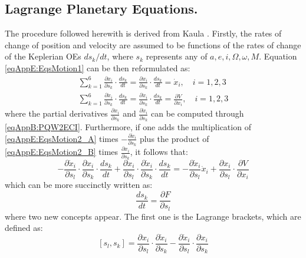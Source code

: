 	\subsection{Lagrange Planetary Equations.}\label{secAppE:LPE}
	\indent The procedure followed herewith is derived from Kaula \cite{Kaula}. Firstly, the rates of change of position and velocity are assumed to be functions of the rates of change of the Keplerian OEs $ds_k/dt$, where $s_k$ represents any of $a, e, i, \Omega, \omega, M$. Equation \eqref{eqAppE:EqsMotion1} can be then reformulated as:
	\begin{align}
	\label{eqAppE:EqsMotion2_A} \sum_{k=1}^{6} \frac{\partial x_{i}}{\partial s_{k}} \cdot \frac{d s_{k}}{d t}=\frac{\partial x_{i}}{\partial s_{k}} \cdot \frac{d s_{k}}{d t}=\dot{x}_{i}, \quad i=1,2,3 \\
	\label{eqAppE:EqsMotion2_B} \sum_{k=1}^{6} \frac{\partial \dot{x}_{i}}{\partial s_{k}} \cdot \frac{d s_{k}}{d t}=\frac{\partial \dot{x}_{i}}{\partial s_{k}} \cdot \frac{d s_{k}}{d t}=\frac{\partial V}{\partial x_{i}}, \quad i=1,2,3
	\end{align}
	\noindent where the partial derivatives $\frac{\partial x_{i}}{\partial s_{k}}$ and $\frac{\partial \dot{x}_{i}}{\partial s_{k}}$ can be computed through \eqref{eqAppB:PQW2ECI}. Furthermore, if one adds the multiplication of \eqref{eqAppE:EqsMotion2_A} times $- \frac{\partial \dot{x}_{i}}{\partial s_{k}}$ plus the product of \eqref{eqAppE:EqsMotion2_B} times $\frac{\partial x_{i}}{\partial s_{k}}$, it follows that:
	\begin{equation}
	-\frac{\partial \dot{x}_{i}}{\partial s_{l}} \cdot \frac{\partial x_{i}}{\partial s_{k}} \cdot \frac{d s_{k}}{d t}+\frac{\partial x_{i}}{\partial s_{l}} \cdot \frac{\partial \dot{x}_{i}}{\partial s_{k}} \cdot \frac{d s_{k}}{d t}=-\frac{\partial \dot{x}_{i}}{\partial s_{l}} \dot{x}_{i}+\frac{\partial x_{i}}{\partial s_{l}} \cdot \frac{\partial V}{\partial x_{i}}
	\label{eqAppE:EqsMotion3}
	\end{equation}
	\noindent which can be more succinctly written as:
	\begin{equation}
	[s_l, s_k] \dfrac{d s_k}{dt} = \dfrac{\partial F}{\partial s_l}
	\label{eqAppE:LPE_compact}
	\end{equation}
	\noindent where two new concepts appear. The first one is the Lagrange brackets, which are defined as:
	\begin{equation}
	\left[s_{l}, s_{k}\right]=\frac{\partial x_{i}}{\partial s_{l}} \cdot \frac{\partial \dot{x}_{i}}{\partial s_{k}}-\frac{\partial \dot{x}_{i}}{\partial s_{l}} \cdot \frac{\partial x_{i}}{\partial s_{k}}
	\end{equation}
